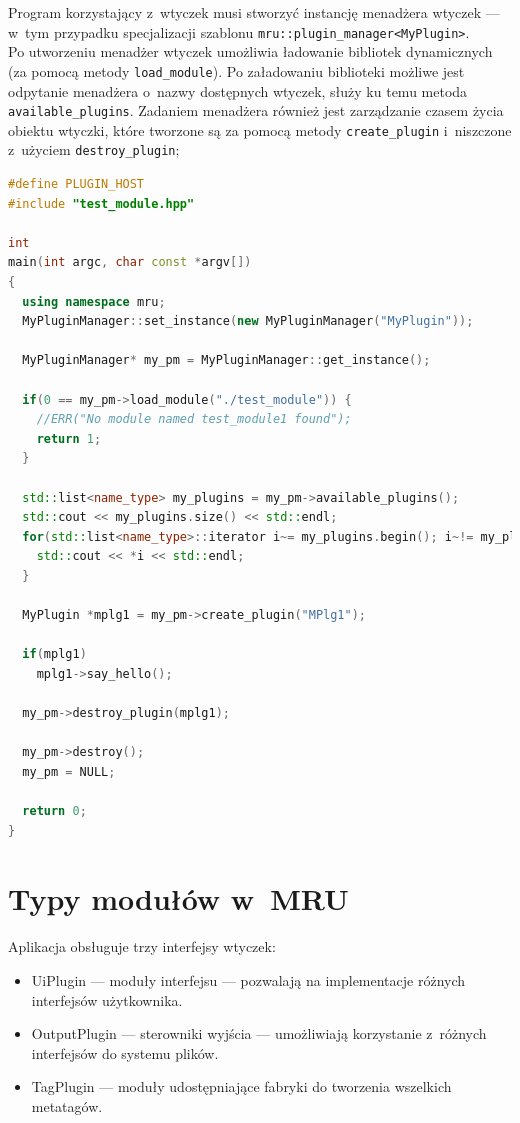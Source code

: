 \par
Program korzystający z~wtyczek musi stworzyć instancję menadżera wtyczek --- w~tym przypadku specjalizacji szablonu \texttt{mru::plugin\_manager<MyPlugin>}.\\
Po utworzeniu menadżer wtyczek umożliwia ładowanie bibliotek dynamicznych (za pomocą metody \texttt{load\_module}). Po załadowaniu biblioteki możliwe jest odpytanie menadżera o~nazwy dostępnych wtyczek, służy ku temu metoda \texttt{available\_plugins}.
Zadaniem menadżera również jest zarządzanie czasem życia obiektu wtyczki, które tworzone są za pomocą metody \texttt{create\_plugin} i~niszczone z~użyciem \texttt{destroy\_plugin};
\begin{lstlisting}[caption={ main.cpp}, language=C++]
#define PLUGIN_HOST
#include "test_module.hpp"

int
main(int argc, char const *argv[])
{
  using namespace mru;
  MyPluginManager::set_instance(new MyPluginManager("MyPlugin"));

  MyPluginManager* my_pm = MyPluginManager::get_instance();

  if(0 == my_pm->load_module("./test_module")) {
    //ERR("No module named test_module1 found");
    return 1;
  }

  std::list<name_type> my_plugins = my_pm->available_plugins();
  std::cout << my_plugins.size() << std::endl;
  for(std::list<name_type>::iterator i~= my_plugins.begin(); i~!= my_plugins.end(); ++i) {
    std::cout << *i << std::endl;
  }

  MyPlugin *mplg1 = my_pm->create_plugin("MPlg1");

  if(mplg1)
    mplg1->say_hello();

  my_pm->destroy_plugin(mplg1); 
  
  my_pm->destroy();
  my_pm = NULL;
  
  return 0;
}
\end{lstlisting}

\section{Typy modułów w~MRU}
\label{moduly}
Aplikacja obsługuje trzy interfejsy wtyczek:
\begin{itemize}
\item UiPlugin --- moduły interfejsu --- pozwalają na implementacje różnych interfejsów użytkownika.
\item OutputPlugin --- sterowniki wyjścia --- umożliwiają korzystanie z~różnych interfejsów do systemu plików.
\item TagPlugin --- moduły udostępniające fabryki do tworzenia wszelkich metatagów.
\end{itemize}

